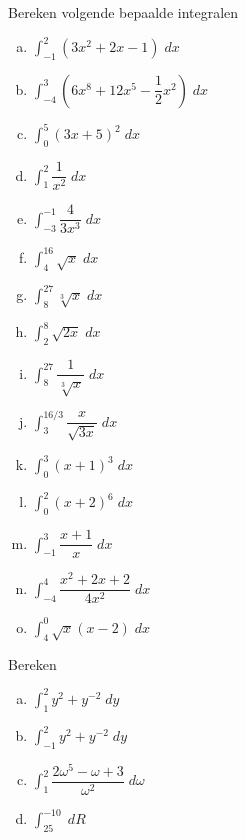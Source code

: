 \documentclass[a4paper,12pt, twoside]{article}
\begin{document}
\begin{oefening}
Bereken volgende bepaalde integralen
\begin{multicols}{2}
\begin{enumerate}[(a)]
\itemsep1em
  \item $\displaystyle \int_{-1}^2 (3x^2+2x-1)\;dx$
  \item $\displaystyle \int_{-4}^3 (6x^8+12x^5-\dfrac{1}{2}x^2)\;dx$
  \item $\displaystyle \int_{0}^5 (3x+5)^2\;dx$
  \item $\displaystyle \int_1^2 \dfrac{1}{x^2}\;dx$
  \item $\displaystyle \int_{-3}^{-1} \dfrac{4}{3x^3} \;dx$
  \item $\displaystyle \int_4^{16} \sqrt{x} \;dx$
  \item $\displaystyle \int_8^{27} \sqrt[3]{x} \;dx$
  \item $\displaystyle \int_2^8 \sqrt{2x} \;dx$
  \item $\displaystyle \int_8^{27} \dfrac{1}{\sqrt[3]{x}} \;dx$
  \item $\displaystyle \int_3^{16/3} \dfrac{x}{\sqrt{3x}} \;dx$
  \item $\displaystyle \int_{0}^3 (x+1)^3\;dx$
  \item $\displaystyle \int_{0}^2 (x+2)^6\;dx$
  \item $\displaystyle \int_{-1}^3 \dfrac{x+1}{x}\;dx$
  \item $\displaystyle \int_{-4}^4 \dfrac{x^2+2x+2}{4x^2}\;dx$
  \item $\displaystyle \int_{4}^0 \sqrt{x}(x-2)\;dx$
\end{enumerate}
\end{multicols}
\end{oefening}

\begin{oefening}
Bereken
\begin{multicols}{2}
\begin{enumerate}[(a)]
\itemsep1em
  \item $\displaystyle \int_1^2 y^2+y^{-2} \;dy$
  \item $\displaystyle \int_{-1}^2 y^2+y^{-2} \;dy$
  \item $\displaystyle \int_1^2 \dfrac{2\omega^5 - \omega + 3}{\omega^2} \;d\omega$
  \item $\displaystyle \int_{25}^{-10} \;dR$
\end{enumerate}
\end{multicols}
\end{oefening}
\end{document}
